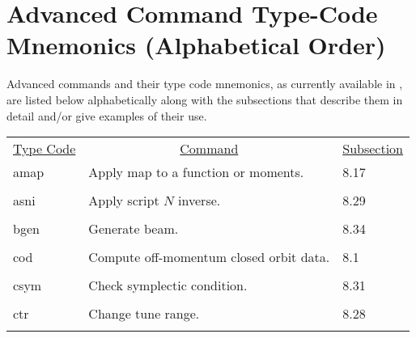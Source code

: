 \section[Advanced Command Type-Code $\cdots$ (Alphabetical Order)]{Advanced Command Type-Code Mnemonics \protect\newline (Alphabetical Order)}
     Advanced commands and their type code mnemonics, as currently
available in , are listed below alphabetically along with the
subsections that describe them in detail and/or give examples of their use.
\begin{center}
\begin{tabular}{lll}
\multicolumn{1}{c}{\underline {Type Code}} &
\multicolumn{1}{c}{\underline{Command}}   &
\multicolumn{1}{c}{\underline{Subsection}} \\
\hspace{1.5em}amap    &     Apply map to a function or moments.  &   \hspace{2em}8.17\\
\vspace{-3mm}& &\\
\hspace{1.5em}asni    &           Apply script $N$ inverse.     &   \hspace{2em}8.29\\
\vspace{-3mm}& &\\
\hspace{1.5em}bgen    &           Generate beam.     &   \hspace{2em}8.34\\
\vspace{-3mm}& &\\
\hspace{1.5em}cod     &   Compute off-momentum closed orbit data.  & \hspace{2em}8.1\\
\vspace{-3mm}& &\\
\hspace{1.5em}csym    &           Check symplectic condition.    &   \hspace{2em}8.31\\
\vspace{-3mm}& &\\
\hspace{1.5em}ctr     &           Change tune range.         &   \hspace{2em}8.28\\
\vspace{-3mm}& &\\

\end{tabular}
\end{center}
